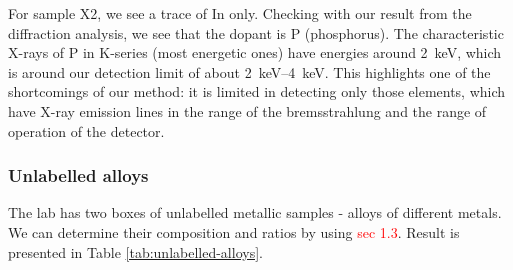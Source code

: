 \documentclass[11pt,a4paper,twoside,onecolumn]{article}
\newcommand{\reminder}[1]{\textcolor{red}{#1}}
\begin{document}
For sample X2, we see a trace of In only. Checking with our result from the diffraction analysis, we see that the dopant is P (phosphorus). The characteristic X-rays of P in K-series (most energetic ones) have energies around \qty{2}{keV}, which is around our detection limit of about \qtyrange{2}{4}{keV}. This highlights one of the shortcomings of our method: it is limited in detecting only those elements, which have X-ray emission lines in the range of the bremsstrahlung and the range of operation of the detector.

\subsubsection{Unlabelled alloys}\label{subsubsec:unlabelled-alloys}
The lab has two boxes of unlabelled metallic samples - alloys of different metals. We can determine their composition and ratios by using \reminder{sec 1.3}. Result is presented in Table \ref{tab:unlabelled-alloys}.
\end{document}
